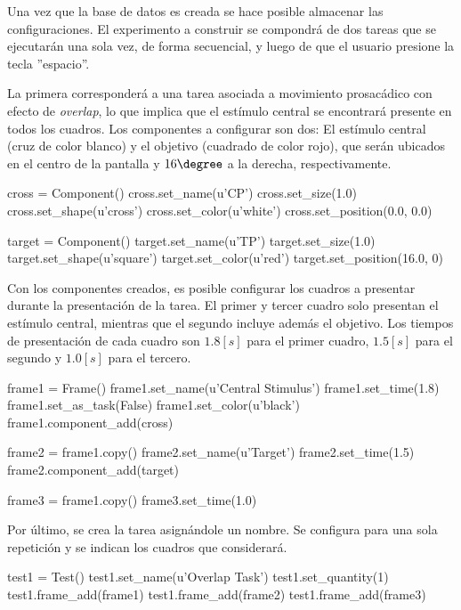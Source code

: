 \documentclass[\main/main.tex]{subfiles}
\begin{document}
        Una vez que la base de datos es creada se hace posible almacenar las configuraciones. El experimento a construir se compondrá de dos tareas que se ejecutarán una sola vez, de forma secuencial, y luego de que el usuario presione la tecla ''espacio''. 

        La primera corresponderá a una tarea asociada a movimiento prosacádico con efecto de \textit{overlap}, lo que implica que el estímulo central se encontrará presente en todos los cuadros. Los componentes a configurar son dos: El estímulo central (cruz de color blanco) y el objetivo (cuadrado de color rojo), que serán ubicados en el centro de la pantalla y $16\degree$ a la derecha, respectivamente. 

\begin{singlespace}\begin{python}
cross = Component()
cross.set_name(u'CP')
cross.set_size(1.0)
cross.set_shape(u'cross')
cross.set_color(u'white')
cross.set_position(0.0, 0.0)

target = Component()
target.set_name(u'TP')
target.set_size(1.0)
target.set_shape(u'square')
target.set_color(u'red')
target.set_position(16.0, 0)
\end{python}\end{singlespace}

        Con los componentes creados, es posible configurar los cuadros a presentar durante la presentación de la tarea. El primer y tercer cuadro solo presentan el estímulo central, mientras que el segundo incluye además el objetivo. Los tiempos de presentación de cada cuadro son $1.8[s]$ para el primer cuadro, $1.5[s]$ para el segundo y $1.0[s]$ para el tercero. 

\begin{singlespace}\begin{python}
frame1 = Frame()
frame1.set_name(u'Central Stimulus')
frame1.set_time(1.8)
frame1.set_as_task(False)
frame1.set_color(u'black')
frame1.component_add(cross)

frame2 = frame1.copy()
frame2.set_name(u'Target')
frame2.set_time(1.5)
frame2.component_add(target)

frame3 = frame1.copy()
frame3.set_time(1.0)
\end{python}\end{singlespace}

        Por último, se crea la tarea asignándole un nombre. Se configura para una sola repetición y se indican los cuadros que considerará. 

\begin{singlespace}\begin{python}
test1 = Test()
test1.set_name(u'Overlap Task')
test1.set_quantity(1)
test1.frame_add(frame1)
test1.frame_add(frame2)
test1.frame_add(frame3)
\end{python}\end{singlespace}
\end{document}
